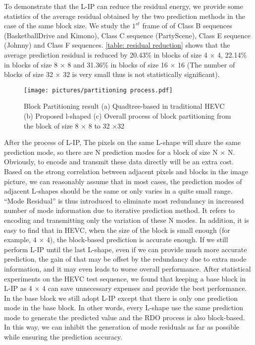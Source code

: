 \documentclass[journal]{IEEEtran}
\begin{document}
To demonstrate that the L-IP can reduce the residual energy, we provide some statistics of the average residual obtained by the two prediction methods in the case of the same block size. We study the $1^{st}$ frame of of Class B sequences (BasketballDrive and Kimono), Class C sequence (PartyScene), Class E sequence (Johnny) and Class F sequences. \autoref{table: residual reduction} shows that the average prediction residual is reduced by 20.43\% in blocks of size 4 × 4, 22.14\% in blocks of size 8 × 8 and 31.36\% in blocks of size 16 × 16 (The number of blocks of size 32 × 32 is very small thus is not statistically significant).

\begin{figure*}[tp]
    \centering
    \texttt{[image: pictures/partitioning process.pdf]}
    \caption{Block Partitioning result (a) Quadtree-based in traditional HEVC (b) Proposed l-shaped (c) Overall process of block partitioning from the block of size 8 × 8 to 32 ×32}
    \label{fig:partitioning}
\end{figure*}
After the process of L-IP, The pixels on the same L-shape will share the same prediction mode, so there are N prediction modes for a block of size N × N. Obviously, to encode and transmit these data directly will be an extra cost. Based on the strong correlation between adjacent pixels and blocks in the image picture, we can reasonably assume that in most cases, the prediction modes of adjacent L-shapes should be the same or only varies in a quite small range. ``Mode Residual'' is thus introduced to eliminate most redundancy in increased number of mode information due to iterative prediction method. It refers to encoding and transmitting only the variation of these N modes. In addition, it is easy to find that in HEVC, when the size of the block is small enough (for example, 4 × 4), the block-based prediction is accurate enough. If we still perform L-IP until the last L-shape, even if we can provide much more accurate prediction, the gain of that may be offset by the redundancy due to extra mode information, and it may even leads to worse overall performance. After statistical experiments on the HEVC test sequence, we found that keeping a base block in L-IP as 4 × 4 can save unnecessary expenses and provide the best performance. In the base block we still adopt L-IP except that there is only one prediction mode in the base block. In other words, every L-shape use the same prediction mode to generate the predicted value and the RDO process is also block-based. In this way, we can inhibit the generation of mode residuals as far as possible while ensuring the prediction accuracy.
\end{document}
